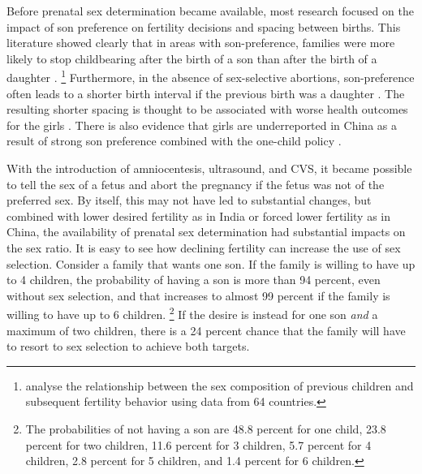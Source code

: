 \documentclass[letterpaper,12pt]{article}
\begin{document}
Before prenatal sex determination became available, most research
focused on the impact of son preference on fertility decisions and
spacing between births.
This literature showed clearly that in areas with son-preference,
families were more likely to stop childbearing after the birth of a son
than after the birth of a daughter \citep[see, for
example,][]{Das1987,Arnold1997,clark00}.%
\footnote{
\citet{filmer09} analyse the relationship between the sex composition of
previous children and subsequent fertility behavior using data from 64
countries.}
Furthermore, in the absence of sex-selective abortions, son-preference
often leads to a shorter birth interval if the previous birth was a
daughter \citep[see, for
example,][]{Das1987,Rahman1993,Pong1994,Haughton1996,Arnold1997}.
The resulting shorter spacing is thought to be associated with worse
health outcomes for the girls
\citep{arnold98,Whitworth2002,Rutstein2005,Conde-Agudelo2006}.
There is also evidence that girls are underreported in China as a result
of strong son preference combined with the one-child policy
\citep{Merli2000}.

With the introduction of amniocentesis, ultrasound, and CVS, it became
possible to tell the sex of a fetus and abort the pregnancy if the fetus
was not of the preferred sex.
By itself, this may not have led to substantial changes, but combined
with lower desired fertility as in India or forced lower fertility as in
China, the availability of prenatal sex determination had substantial
impacts on the sex ratio.
It is easy to see how declining fertility can increase the use of sex
selection.
Consider a family that wants one son.
If the family is willing to have up to 4 children, the probability of
having a son is more than 94 percent, even without sex selection, and
that increases to almost 99 percent if the family is willing to have up
to 6 children.%
\footnote{
The probabilities of not having a son are 48.8 percent for one child,
23.8 percent for two children, 11.6 percent for 3 children, 5.7 percent
for 4 children, 2.8 percent for 5 children, and 1.4 percent for 6
children.}
If the desire is instead for one son \emph{and} a maximum of two
children, there is a 24 percent chance that the family will have to
resort to sex selection to achieve both targets.
\end{document}
